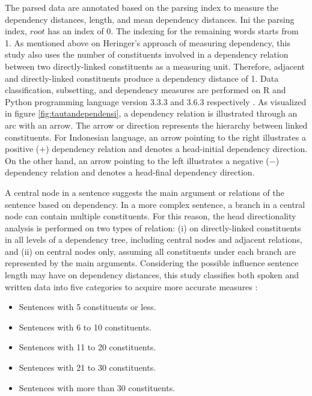 \documentclass[10pt, a4paper, conference, compsocconf]{IEEEtran}
\begin{document}
The parsed data are annotated based on the parsing index to measure the dependency distances, length, and mean dependency distances. Ini the parsing index, $root$ has an index of 0. The indexing for the remaining words starts from 1. As mentioned above on Heringer's approach of measuring dependency, this study also uses the number of constituents involved in a dependency relation between two directly-linked constituents as a measuring unit. Therefore, adjacent and directly-linked constituents produce a dependency distance of 1. Data classification, subsetting, and dependency measures are performed on R and Python programming language version 3.3.3 and 3.6.3 respectively \cite{r2017project, python2017manual}. As visualized in figure \ref{fig:tautandependensi}, a dependency relation is illustrated through an arc with an arrow. The arrow or direction represents the hierarchy between linked constituents. For Indonesian language, an arrow pointing to the right illustrates a positive ($+$) dependency relation and denotes a head-initial dependency direction. On the other hand, an arrow pointing to the left illustrates a negative ($-$) dependency relation and denotes a head-final dependency direction.

A central node in a sentence suggests the main argument or relations of the sentence based on dependency. In a more complex sentence, a branch in a central node can contain multiple constituents. For this reason, the head directionality analysis is performed on two types of relation: (i) on directly-linked constituents in all levels of a dependency tree, including central nodes and adjacent relations, and (ii) on central nodes only, assuming all constituents under each branch are represented by the main arguments. Considering the possible influence sentence length may have on dependency distances, this study classifies both spoken and written data into five categories to acquire more accurate measures \cite{liu2017dependency, i2004euclidean, oya2011syntactic, jiang2015effects}:
\begin{itemize}
\item Sentences with 5 constituents or less.
\item Sentences with 6 to 10 constituents.
\item Sentences with 11 to 20 constituents.
\item Sentences with 21 to 30 constituents.
\item Sentences with more than 30 constituents.
\end{itemize}
\end{document}
